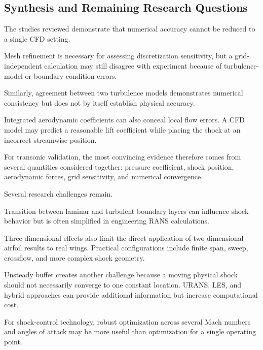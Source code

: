 \documentclass[10pt]{article}
\begin{document}

\subsection{Synthesis and Remaining Research Questions}

The studies reviewed demonstrate that numerical accuracy cannot be
reduced to a single CFD setting.

Mesh refinement is necessary for assessing discretization sensitivity,
but a grid-independent calculation may still disagree with experiment
because of turbulence-model or boundary-condition errors.

Similarly, agreement between two turbulence models demonstrates
numerical consistency but does not by itself establish physical
accuracy.

Integrated aerodynamic coefficients can also conceal local flow errors.
A CFD model may predict a reasonable lift coefficient while placing the
shock at an incorrect streamwise position.

For transonic validation, the most convincing evidence therefore comes
from several quantities considered together: pressure coefficient,
shock position, aerodynamic forces, grid sensitivity, and numerical
convergence.

Several research challenges remain.

Transition between laminar and turbulent boundary layers can influence
shock behavior but is often simplified in engineering RANS calculations.

Three-dimensional effects also limit the direct application of
two-dimensional airfoil results to real wings. Practical configurations
include finite span, sweep, crossflow, and more complex shock geometry.

Unsteady buffet creates another challenge because a moving physical
shock should not necessarily converge to one constant location. URANS,
LES, and hybrid approaches can provide additional information but
increase computational cost.

For shock-control technology, robust optimization across several Mach
numbers and angles of attack may be more useful than optimization for a
single operating point.

\end{document}
